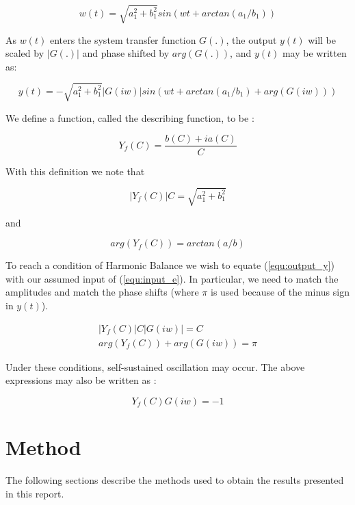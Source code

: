 \documentclass[a4paper, titlepage]{article}
\begin{document}
\begin{equation}
	w(t) = \sqrt{a_{1}^2+b_{1}^2}sin(wt+arctan(a_{1}/b_{1}))
\end{equation}

As $w(t)$ enters the system transfer function $G(.)$, the output $y(t)$ will be scaled by $|G(.)|$ and phase shifted by $arg(G(.))$, and $y(t)$ may be written as:

\begin{equation}
	y(t) = -\sqrt{a_{1}^2+b_{1}^2}|G(iw)|sin(wt+arctan(a_{1}/b_{1})+arg(G(iw)))
	\label{equ:output_y}
\end{equation}
 

We define a function, called the describing function, to be \citep[p. 358]{glad00}:

\begin{equation}
	Y_{f}(C) = \frac{b(C)+ia(C)}{C}
	\label{equ:descrbingFunction}
\end{equation}

With this definition we note that

\begin{equation}
	|Y_{f}(C)|C = \sqrt{a_{1}^2+b_{1}^2}
\end{equation}

and

\begin{equation}
	arg(Y_{f}(C)) = arctan(a/b)
\end{equation}

To reach a condition of Harmonic Balance we wish to equate (\ref{equ:output_y}) with our assumed input of (\ref{equ:input_e}).   
In particular, we need to match the amplitudes and match the phase shifts (where $\pi$ is used because of the minus sign in $y(t)$). 

\begin{equation}
\begin{split}
	|Y_{f}(C)|C|G(iw)| = C \\
	arg(Y_{f}(C))+arg(G(iw)) = \pi
\end{split}
\end{equation}

Under these conditions, self-sustained oscillation may occur.  The above expressions may also be written as \citep[p. 359]{glad00}:

\begin{equation}
	Y_{f}(C)G(iw) = -1
\label{equ:selfOsc}
\end{equation}
 
\section{Method}
The following sections describe the methods used to obtain the results presented in this report.
\end{document}
